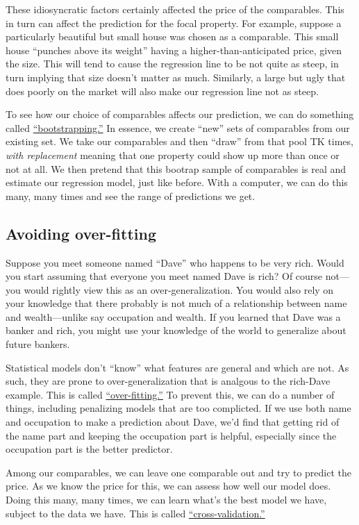 \documentclass[
12pt, %
letterpaper, %
oneside, %
headinclude,footinclude, %
BCOR5mm, %
]{scrartcl}
\begin{document}
These idiosyncratic factors certainly affected the price of the comparables.
This in turn can affect the prediction for the focal property. 
For example, suppose a particularly beautiful but small house was chosen as a comparable.
This small house ``punches above its weight'' having a higher-than-anticipated price, given the size.
This will tend to cause the regression line to be not quite as steep, in turn implying that size doesn't matter as much.
Similarly, a large but ugly that does poorly on the market will also make our regression line not as steep.

To see how our choice of comparables affects our prediction, we can do something called \href{https://en.wikipedia.org/wiki/Bootstrapping_(statistics)}{``bootstrapping.''}
In essence, we create ``new'' sets of comparables from our existing set.
We take our comparables and then ``draw'' from that pool TK times, \emph{with replacement} meaning that one property could show up more than once or not at all.
We then pretend that this bootrap sample of comparables is real and estimate our regression model, just like before.
With a computer, we can do this many, many times and see the range of predictions we get. 

\subsection{Avoiding over-fitting} \label{sec:regularization}
Suppose you meet someone named ``Dave'' who happens to be very rich.
Would you start assuming that everyone you meet named Dave is rich?
Of course not---you would rightly view this as an over-generalization.
You would also rely on your knowledge that there probably is not much of a relationship between name and wealth---unlike say occupation and wealth.
If you learned that Dave was a banker and rich, you might use your knowledge of the world to generalize about future bankers.

Statistical models don't ``know'' what features are general and which are not.
As such, they are prone to over-generalization that is analgous to the rich-Dave example. 
This is called \href{https://en.wikipedia.org/wiki/Overfitting}{``over-fitting.''}
To prevent this, we can do a number of things, including penalizing models that are too complicted.
If we use both name and occupation to make a prediction about Dave, we'd find that getting rid of the name part and keeping the occupation part is helpful, especially since the occupation part is the better predictor. 

Among our comparables, we can leave one comparable out and try to predict the price.
As we know the price for this, we can assess how well our model does.
Doing this many, many times, we can learn what's the best model we have, subject to the data we have.
This is called \href{https://en.wikipedia.org/wiki/Cross-validation_(statistics)}{``cross-validation.''}

\end{document}
